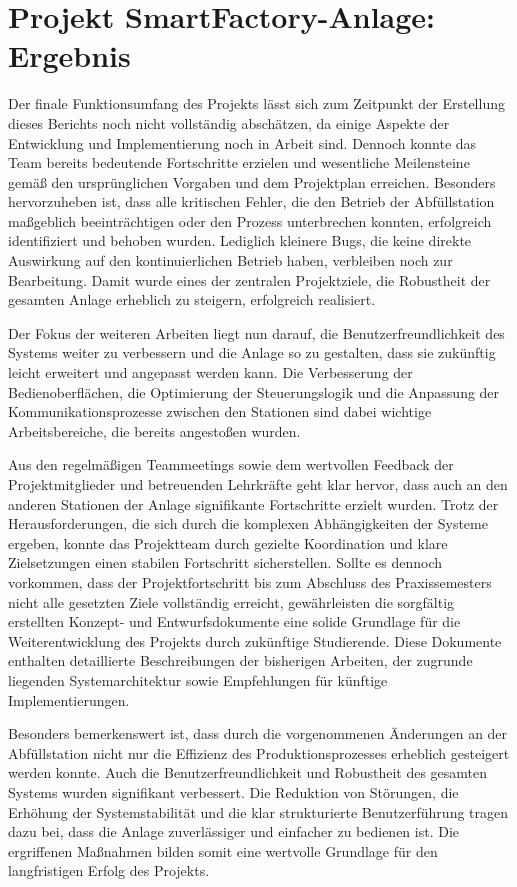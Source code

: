 \section{Projekt SmartFactory-Anlage: Ergebnis}\label{sec:Projekt_SmartFactory-Anlage:_Ergebnis}

Der finale Funktionsumfang des Projekts lässt sich zum Zeitpunkt der Erstellung dieses Berichts noch nicht vollständig abschätzen, da einige 
Aspekte der Entwicklung und Implementierung noch in Arbeit sind. Dennoch konnte das Team bereits bedeutende Fortschritte erzielen und wesentliche 
Meilensteine gemäß den ursprünglichen Vorgaben und dem Projektplan erreichen. Besonders hervorzuheben ist, dass alle kritischen Fehler, die den 
Betrieb der Abfüllstation maßgeblich beeinträchtigen oder den Prozess unterbrechen konnten, erfolgreich identifiziert und behoben wurden. 
Lediglich kleinere Bugs, die keine direkte Auswirkung auf den kontinuierlichen Betrieb haben, verbleiben noch zur Bearbeitung. Damit wurde 
eines der zentralen Projektziele, die Robustheit der gesamten Anlage erheblich zu steigern, erfolgreich realisiert.

Der Fokus der weiteren Arbeiten liegt nun darauf, die Benutzerfreundlichkeit des Systems weiter zu verbessern und die Anlage so zu gestalten, 
dass sie zukünftig leicht erweitert und angepasst werden kann. Die Verbesserung der Bedienoberflächen, die Optimierung der Steuerungslogik und 
die Anpassung der Kommunikationsprozesse zwischen den Stationen sind dabei wichtige Arbeitsbereiche, die bereits angestoßen wurden.

Aus den regelmäßigen Teammeetings sowie dem wertvollen Feedback der Projektmitglieder und betreuenden Lehrkräfte geht klar hervor, dass auch an 
den anderen Stationen der Anlage signifikante Fortschritte erzielt wurden. Trotz der Herausforderungen, die sich durch die komplexen 
Abhängigkeiten der Systeme ergeben, konnte das Projektteam durch gezielte Koordination und klare Zielsetzungen einen stabilen Fortschritt 
sicherstellen. Sollte es dennoch vorkommen, dass der Projektfortschritt bis zum Abschluss des Praxissemesters nicht alle gesetzten Ziele 
vollständig erreicht, gewährleisten die sorgfältig erstellten Konzept- und Entwurfsdokumente eine solide Grundlage für die Weiterentwicklung 
des Projekts durch zukünftige Studierende. Diese Dokumente enthalten detaillierte Beschreibungen der bisherigen Arbeiten, der zugrunde liegenden 
Systemarchitektur sowie Empfehlungen für künftige Implementierungen.

Besonders bemerkenswert ist, dass durch die vorgenommenen Änderungen an der Abfüllstation nicht nur die Effizienz des Produktionsprozesses 
erheblich gesteigert werden konnte. Auch die Benutzerfreundlichkeit und Robustheit des gesamten Systems wurden signifikant verbessert. 
Die Reduktion von Störungen, die Erhöhung der Systemstabilität und die klar strukturierte Benutzerführung tragen dazu bei, dass die Anlage 
zuverlässiger und einfacher zu bedienen ist. Die ergriffenen Maßnahmen bilden somit eine wertvolle Grundlage für den langfristigen Erfolg 
des Projekts.
